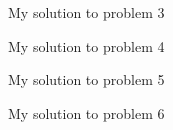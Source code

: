 \documentclass[a4paper,11pt]{article}
\begin{document}
\begin{mlsolution}

My solution to problem 3

\end{mlsolution}

\begin{mlsolution}

My solution to problem 4

\end{mlsolution}

\begin{mlsolution}

My solution to problem 5

\end{mlsolution}

\begin{mlsolution}

My solution to problem 6

\end{mlsolution}
\end{document}
